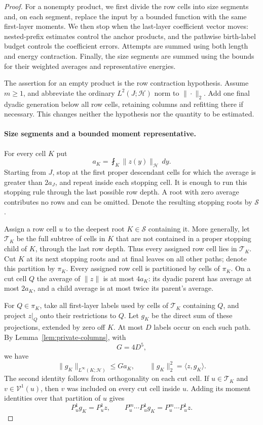 \begin{proof}
For a nonempty product, we first divide the row cells into size segments
and, on each segment, replace the input by a bounded function with the
same first-layer moments.  We then stop when the last-layer coefficient
vector moves: nested-prefix estimates control the anchor products, and
the pathwise birth-label budget controls the coefficient errors.
Attempts are summed using both length and energy contraction.  Finally,
the size segments are summed using the bounds for their weighted
averages and representative energies.

The assertion for an empty product is the row contraction hypothesis.  Assume
$m\ge1$, and abbreviate the ordinary $L^2(J;\mathcal H)$ norm to $\|\cdot\|_2$.
Add one final dyadic generation below all row cells, retaining columns and
refitting there if necessary.  This changes neither the hypothesis nor the
quantity to be estimated.

\paragraph{Size segments and a bounded moment representative.}
For every cell $K$ put
\[
 a_K=\fint_K\|z(y)\|_{\mathcal H}\,dy.
\]
Starting from $J$, stop at the first proper descendant cells for which the
average is greater than $2a_J$, and repeat inside each stopping cell.  It is
enough to run this stopping rule through the last possible row depth.  A root
with zero average contributes no rows and can be omitted.  Denote the
resulting stopping roots by $\mathcal S$.

Assign a row cell $u$ to the deepest root $K\in\mathcal S$ containing it.
More generally, let $\mathcal T_K$ be the full subtree of cells in $K$ that
are not contained in a proper stopping child of $K$, through the last row
depth.  Thus every assigned row cell lies in $\mathcal T_K$.  Cut $K$ at its
next stopping roots and at final leaves on all other paths; denote this
partition by $\pi_K$.  Every assigned row cell is partitioned by cells of
$\pi_K$.  On a cut cell $Q$ the average of $\|z\|$ is at most $4a_K$: its
dyadic parent has average at most $2a_K$, and a child average is at most twice
its parent's average.

For $Q\in\pi_K$, take all first-layer labels used by cells of
$\mathcal T_K$ containing $Q$, and project $z|_Q$ onto their restrictions to
$Q$.  Let $g_K$ be the direct sum of these projections, extended by zero off
$K$.  At most $D$ labels occur on each such path.  By
Lemma~\ref{lem:private-columns}, with
\[
 G=4D^5,
\]
we have
\[
 \|g_K\|_{L^\infty(K;\mathcal H)}\le Ga_K,
 \qquad \|g_K\|_2^2=\langle z,g_K\rangle.
\]
The second identity follows from orthogonality on each cut cell.  If
$u\in\mathcal T_K$ and $v\in\mathcal V^1(u)$, then $v$ was included on
every cut cell inside $u$.  Adding its moment identities over that partition
of $u$ gives
\[
 P_u^1g_K=P_u^1z,
 \qquad P_u^m\cdots P_u^1g_K=P_u^m\cdots P_u^1z.
\]


\end{proof}
